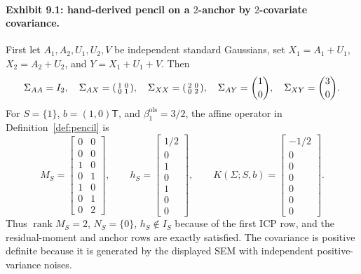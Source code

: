 \documentclass[11pt]{article}
\newcommand{\transpose}{\mathsf{T}}
\theoremstyle{definition}
\theoremstyle{plain}
\theoremstyle{remark}
\begin{document}
\paragraph{Exhibit 9.1: hand-derived pencil on a $2$-anchor by $2$-covariate covariance.}
First let $A_1,A_2,U_1,U_2,V$ be independent standard Gaussians, set $X_1=A_1+U_1$, $X_2=A_2+U_2$, and $Y=X_1+U_1+V$. Then
\[
\Sigma_{AA}=I_2,\quad
\Sigma_{AX}=\begin{psmallmatrix}1&0\\0&1\end{psmallmatrix},\quad
\Sigma_{XX}=\begin{psmallmatrix}2&0\\0&2\end{psmallmatrix},\quad
\Sigma_{AY}=\binom{1}{0},\quad
\Sigma_{XY}=\binom{3}{0}.
\]
For $S=\{1\}$, $b=(1,0)\transpose$, and $\beta_1^{\mathrm{ols}}=3/2$, the affine operator in Definition~\ref{def:pencil} is
\[
M_S=
\begin{bmatrix}
0&0\\0&0\\
1&0\\0&1\\
1&0\\0&1\\
0&2
\end{bmatrix},\qquad
h_S=
\begin{bmatrix}
1/2\\0\\
1\\0\\
1\\0\\
0
\end{bmatrix},\qquad
K(\Sigma;S,b)=
\begin{bmatrix}
-1/2\\0\\
0\\0\\
0\\0\\
0
\end{bmatrix}.
\]
Thus $\operatorname{rank}M_S=2$, $N_S=\{0\}$, $h_S\notin I_S$ because of the first ICP row, and the residual-moment and anchor rows are exactly satisfied. The covariance is positive definite because it is generated by the displayed SEM with independent positive-variance noises.
\end{document}
